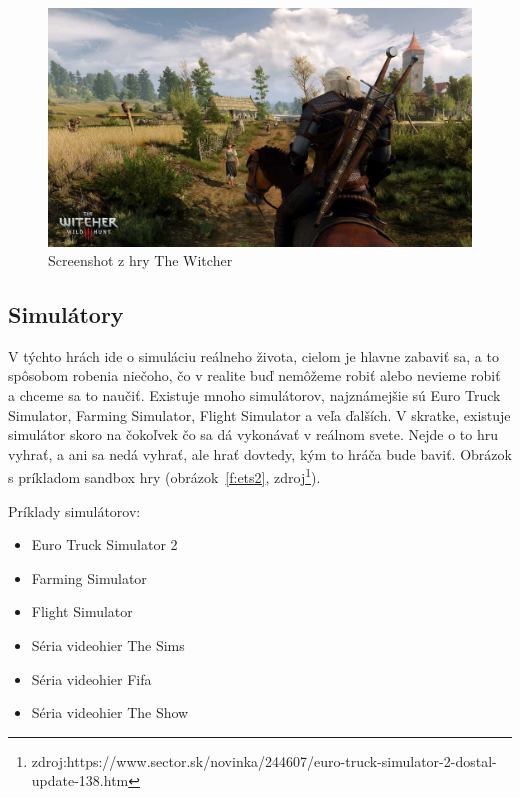 \documentclass[10pt,oneside,slovak,a4paper]{article}
\begin{document}
\begin{figure}[h]
\centering
\includegraphics[scale=0.15]{rpg.jpg}
\caption{Screenshot z hry The Witcher}
\label{f:rpg}
\end{figure}


\subsection{Simulátory} \label{zanre:simulatory}

V týchto hrách ide o simuláciu reálneho života, cielom je hlavne zabaviť sa, a to spôsobom robenia niečoho, čo v realite buď nemôžeme robiť alebo nevieme robiť a chceme sa to naučiť. Existuje mnoho simulátorov, najznámejšie sú Euro Truck Simulator, Farming Simulator, Flight Simulator a veľa ďalších. V skratke, existuje simulátor skoro na čokoľvek čo sa dá vykonávať v reálnom svete. Nejde o to hru vyhrať, a ani sa nedá vyhrať, ale hrať dovtedy, kým to hráča bude baviť. Obrázok s príkladom sandbox hry (obrázok~\ref{f:ets2}, zdroj\footnote{zdroj:https://www.sector.sk/novinka/244607/euro-truck-simulator-2-dostal-update-138.htm}).

Príklady simulátorov:
\begin{itemize}
\item Euro Truck Simulator 2
\item Farming Simulator
\item Flight Simulator
\item Séria videohier The Sims
\item Séria videohier Fifa
\item Séria videohier The Show
\end{itemize}
\end{document}
